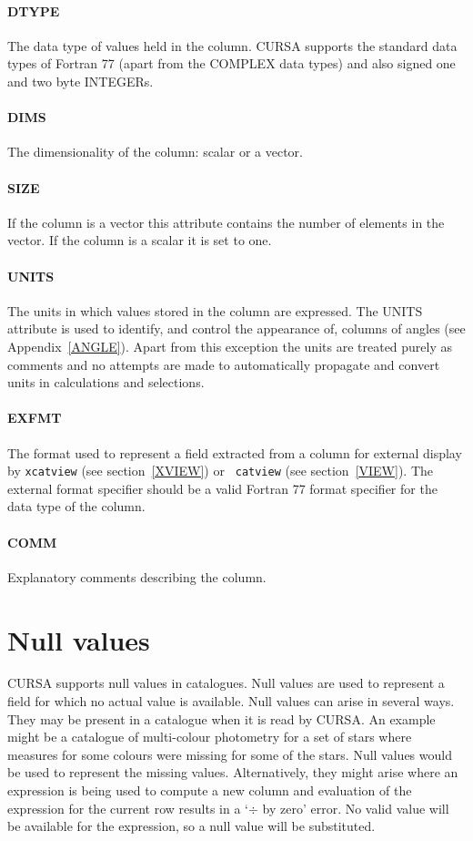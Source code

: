 \documentclass[twoside,11pt]{article}
\newcommand{\xlabel}[1]{}
\renewcommand{\_}{\texttt{\symbol{95}}}
\begin{document}
\paragraph{DTYPE}
The data type of values held in the column. CURSA supports the
standard data types of Fortran 77 (apart from the COMPLEX data types)
and also signed one and two byte INTEGERs.

\paragraph{DIMS}
The dimensionality of the column: scalar or a vector.

\paragraph{SIZE}
If the column is a vector this attribute contains the number of
elements in the vector. If the column is a scalar it is set to one.

\paragraph{UNITS}
The units in which values stored in the column are expressed. The UNITS
attribute is used to identify, and control the appearance of, columns
of angles (see Appendix~\ref{ANGLE}). Apart from this exception the units
are treated purely as comments and no attempts are made to automatically
propagate and convert units in calculations and selections.

\paragraph{EXFMT}
The format used to represent a field extracted from a column for
external display by {\tt xcatview} (see section~\ref{XVIEW}) or {\tt
catview} (see section~\ref{VIEW}). The external format specifier should be
a valid Fortran 77 format specifier for the data type of the column.

\paragraph{COMM}
Explanatory comments describing the column.


\section{\xlabel{NULLS}\label{NULLS}Null values}

CURSA supports null values in catalogues. Null values are used to represent
a field for which no actual value is available. Null values can arise in
several ways. They may be present in a catalogue when it is read by
CURSA. An example might be a catalogue of multi-colour photometry for a
set of stars where measures for some colours were missing for some of the
stars. Null values would be used to represent the missing values.
Alternatively, they might arise where an expression is being used to
compute a new column and evaluation of the expression for the current
row results in a `$\div$ by zero' error. No valid value will be
available for the expression, so a null value will be substituted.
\end{document}
